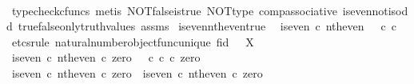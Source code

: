 \begin{isabellebody}
%
\isadelimproof
\ \ %
\endisadelimproof
%
\isatagproof
{}\isamarkupfalse%
\ {\isacharparenleft}{\kern0pt}typecheck{\isacharunderscore}{\kern0pt}cfuncs{\isacharcomma}{\kern0pt}\ metis\ NOT{\isacharunderscore}{\kern0pt}false{\isacharunderscore}{\kern0pt}is{\isacharunderscore}{\kern0pt}true\ NOT{\isacharunderscore}{\kern0pt}type\ comp{\isacharunderscore}{\kern0pt}associative{}\ is{\isacharunderscore}{\kern0pt}even{\isacharunderscore}{\kern0pt}not{\isacharunderscore}{\kern0pt}is{\isacharunderscore}{\kern0pt}odd\ true{\isacharunderscore}{\kern0pt}false{\isacharunderscore}{\kern0pt}only{\isacharunderscore}{\kern0pt}truth{\isacharunderscore}{\kern0pt}values\ assms{\isacharparenright}{\kern0pt}%
\endisatagproof
{\isafoldproof}%
%
\isadelimproof
\isanewline
%
\endisadelimproof
\isanewline
{}\isamarkupfalse%
\ is{\isacharunderscore}{\kern0pt}even{\isacharunderscore}{\kern0pt}nth{\isacharunderscore}{\kern0pt}even{\isacharunderscore}{\kern0pt}true{\isacharcolon}{\kern0pt}\isanewline
\ \ {\isachardoublequoteopen}is{\isacharunderscore}{\kern0pt}even\ {\isasymcirc}\isactrlsub c\ nth{\isacharunderscore}{\kern0pt}even\ {\isacharequal}{\kern0pt}\ {\isasymt}\ {\isasymcirc}\isactrlsub c\ {\isasymbeta}\isactrlbsub {\isasymnat}\isactrlsub c\isactrlesub {\isachardoublequoteclose}\isanewline
%
\isadelimproof
%
\endisadelimproof
%
\isatagproof
{}\isamarkupfalse%
\ {\isacharparenleft}{\kern0pt}etcs{\isacharunderscore}{\kern0pt}rule\ natural{\isacharunderscore}{\kern0pt}number{\isacharunderscore}{\kern0pt}object{\isacharunderscore}{\kern0pt}func{\isacharunderscore}{\kern0pt}unique{\isacharbrackleft}{\kern0pt}\ f{\isacharequal}{\kern0pt}{\isachardoublequoteopen}id\ {\isasymOmega}{\isachardoublequoteclose}{\isacharcomma}{\kern0pt}\ \ X{\isacharequal}{\kern0pt}{\isasymOmega}{\isacharbrackright}{\kern0pt}{\isacharparenright}{\kern0pt}\isanewline
\ \ \isamarkupfalse%
\ {\isachardoublequoteopen}{\isacharparenleft}{\kern0pt}is{\isacharunderscore}{\kern0pt}even\ {\isasymcirc}\isactrlsub c\ nth{\isacharunderscore}{\kern0pt}even{\isacharparenright}{\kern0pt}\ {\isasymcirc}\isactrlsub c\ zero\ {\isacharequal}{\kern0pt}\ {\isacharparenleft}{\kern0pt}{\isasymt}\ {\isasymcirc}\isactrlsub c\ {\isasymbeta}\isactrlbsub {\isasymnat}\isactrlsub c\isactrlesub {\isacharparenright}{\kern0pt}\ {\isasymcirc}\isactrlsub c\ zero{\isachardoublequoteclose}\isanewline
\ \ \isamarkupfalse%
\ {\isacharminus}{\kern0pt}\isanewline
\ \ \ \ \isamarkupfalse%
\ {\isachardoublequoteopen}{\isacharparenleft}{\kern0pt}is{\isacharunderscore}{\kern0pt}even\ {\isasymcirc}\isactrlsub c\ nth{\isacharunderscore}{\kern0pt}even{\isacharparenright}{\kern0pt}\ {\isasymcirc}\isactrlsub c\ zero\ {\isacharequal}{\kern0pt}\ is{\isacharunderscore}{\kern0pt}even\ {\isasymcirc}\isactrlsub c\ nth{\isacharunderscore}{\kern0pt}even\ {\isasymcirc}\isactrlsub c\ zero{\isachardoublequoteclose}\isanewline

\end{isabellebody}
